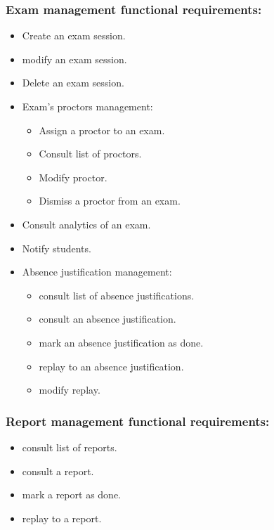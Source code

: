 \documentclass[a4paper,12p]{article}
\begin{document}
     \subsubsection{Exam management functional requirements:}
     \begin{itemize}
        \item Create an exam session.
        \item modify an exam session.
        \item Delete an exam session.
         \item Exam's proctors management:
         \begin{itemize}
            \item Assign a proctor to an exam.
            \item Consult list of proctors.
            \item Modify proctor.
            \item Dismiss a proctor from an exam.
         \end{itemize}
         \item Consult analytics of an exam.
         \item Notify students.
         \item Absence justification management:
         \begin{itemize}
            \item consult list of absence justifications.
            \item consult an absence justification.
            \item mark an absence justification as done.
            \item replay to an absence justification.
            \item modify replay.
         \end{itemize}
     \end{itemize}

     \subsubsection{Report management functional requirements:}
     \begin{itemize}
         \item consult list of reports.
         \item consult a report.
         \item mark a report as done.
         \item replay to a report.
     \end{itemize}
\end{document}
